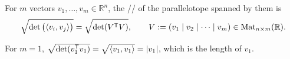 \begin{definition}
\label{def:volume_gram_determinant}
For $m$ vectors $v_1,\dots,v_m \in \mathbb{R}^n$, the //
 of the parallelotope spanned by them is
\[\sqrt{\det\big(\langle v_i,v_j\rangle\big)} = \sqrt{\det(V^{\mathsf{T}} V)},
  \qquad V := (v_1\mid v_2\mid\cdots\mid v_m) \in \mathrm{Mat}_{n\times m}(\mathbb{R}).\]
\end{definition}

\begin{example}[$m=1$: the length of a vector]
\label{ex:gram_m1_length}
For $m=1$, $\sqrt{\det(v_1^{\mathsf{T}} v_1)} = \sqrt{\langle v_1,v_1\rangle} = |v_1|$,
which is the length of $v_1$.
\end{example}

